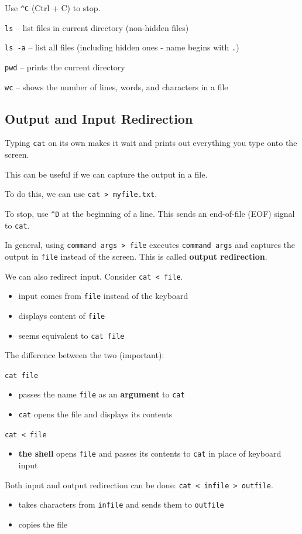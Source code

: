\documentclass[11pt]{article}
\theoremstyle{definition}
\begin{document}
Use {\tt \^ \null C} (Ctrl + C) to stop.

{\tt ls} -- list files in current directory (non-hidden files)

{\tt ls -a} -- list all files (including hidden ones - name begins with {\tt .})

{\tt pwd} -- prints the current directory

{\tt wc} -- shows the number of lines, words, and characters in a file

\subsection{Output and Input Redirection}
Typing {\tt cat} on its own makes it wait and prints out everything you type onto the screen. 

This can be useful if we can capture the output in a file.

To do this, we can use {\tt cat > myfile.txt}.

To stop, use {\tt \^ \null D} at the beginning of a line. This sends an end-of-file (EOF) signal to {\tt cat}.

In general, using {\tt command args > file} executes {\tt command args} and captures the output in {\tt file} instead of the screen. This is called {\bf output redirection}.

We can also redirect input. Consider {\tt cat < file}. \vspace{-0.25cm}
\begin{itemize}
    \item input comes from {\tt file} instead of the keyboard
    \item displays content of {\tt file}
    \item seems equivalent to {\tt cat file}
\end{itemize}
\vspace{-0.25cm}
The difference between the two (important):

{\tt cat file}  \vspace{-0.25cm}
\begin{itemize}
    \item passes the name {\tt file} as an {\bf argument} to {\tt cat}
    \item {\tt cat} opens the file and displays its contents
\end{itemize}
\vspace{-0.25cm}

{\tt cat < file} \vspace{-0.25cm}
\begin{itemize}
    \item {\bf the shell} opens {\tt file} and passes its contents to {\tt cat} in place of keyboard input
\end{itemize}
\vspace{-0.25cm}
Both input and output redirection can be done: {\tt cat < infile > outfile}. \vspace{-0.25cm}
\begin{itemize}
    \item takes characters from {\tt infile} and sends them to {\tt outfile}
    \item copies the file
\end{itemize}
\end{document}
